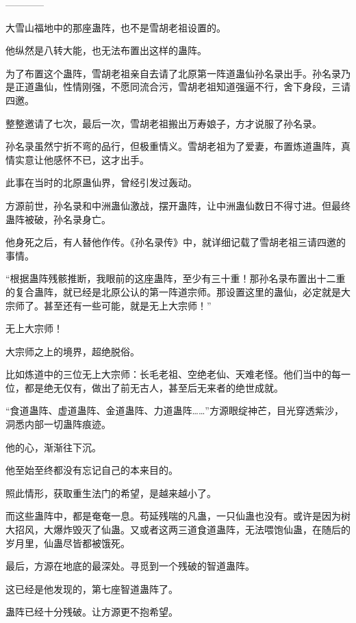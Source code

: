
\begin{this_body}

------------

大雪山福地中的那座蛊阵，也不是雪胡老祖设置的。

他纵然是八转大能，也无法布置出这样的蛊阵。

为了布置这个蛊阵，雪胡老祖亲自去请了北原第一阵道蛊仙孙名录出手。孙名录乃是正道蛊仙，性情刚强，不愿同流合污，雪胡老祖知道强逼不行，舍下身段，三请四邀。

整整邀请了七次，最后一次，雪胡老祖搬出万寿娘子，方才说服了孙名录。

孙名录虽然宁折不弯的品行，但极重情义。雪胡老祖为了爱妻，布置炼道蛊阵，真情实意让他感怀不已，这才出手。

此事在当时的北原蛊仙界，曾经引发过轰动。

方源前世，孙名录和中洲蛊仙激战，摆开蛊阵，让中洲蛊仙数日不得寸进。但最终蛊阵被破，孙名录身亡。

他身死之后，有人替他作传。《孙名录传》中，就详细记载了雪胡老祖三请四邀的事情。

“根据蛊阵残骸推断，我眼前的这座蛊阵，至少有三十重！那孙名录布置出十二重的复合蛊阵，就已经是北原公认的第一阵道宗师。那设置这里的蛊仙，必定就是大宗师了。甚至还有一些可能，就是无上大宗师！”

无上大宗师！

大宗师之上的境界，超绝脱俗。

比如炼道中的三位无上大宗师：长毛老祖、空绝老仙、天难老怪。他们当中的每一位，都是绝无仅有，做出了前无古人，甚至后无来者的绝世成就。

“食道蛊阵、虚道蛊阵、金道蛊阵、力道蛊阵……”方源眼绽神芒，目光穿透紫沙，洞悉内部一切蛊阵痕迹。

他的心，渐渐往下沉。

他至始至终都没有忘记自己的本来目的。

照此情形，获取重生法门的希望，是越来越小了。

而这些蛊阵中，都是奄奄一息。苟延残喘的凡蛊，一只仙蛊也没有。或许是因为树大招风，大爆炸毁灭了仙蛊。又或者这两三道食道蛊阵，无法喂饱仙蛊，在随后的岁月里，仙蛊尽皆都被饿死。

最后，方源在地底的最深处。寻觅到一个残破的智道蛊阵。

这已经是他发现的，第七座智道蛊阵了。

蛊阵已经十分残破。让方源更不抱希望。


\end{this_body}
